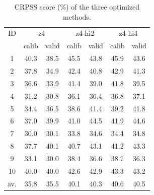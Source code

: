 \documentclass[5p]{elsarticle}
\begin{document}
\begin{table}[htbp]
	\caption{CRPSS score (\%) of the three optimized methods.}
	\footnotesize
	\begin{center}
		\begin{tabular}{ccccccc}
			\hline 
			ID & \multicolumn{2}{c}{z4} & \multicolumn{2}{c}{z4-hi2} & \multicolumn{2}{c}{z4-hi4} \\ 
			& calib & valid & calib & valid & calib & valid \\ 
			\hline 
			1 & 40.3 & 38.5 & 45.5 & 43.8 & 45.9 & 43.6 \\
			2 & 37.8 & 34.9 & 42.4 & 40.8 & 42.9 & 41.3 \\
			3 & 36.6 & 33.9 & 41.4 & 39.0 & 41.8 & 39.5 \\
			4 & 31.2 & 30.8 & 36.1 & 36.4 & 36.8 & 37.1 \\
			5 & 34.4 & 36.5 & 38.6 & 41.4 & 39.2 & 41.8 \\
			6 & 37.0 & 39.9 & 41.0 & 44.5 & 41.9 & 44.6 \\
			7 & 30.0 & 30.1 & 33.8 & 34.6 & 34.4 & 34.8 \\
			8 & 37.7 & 40.1 & 40.7 & 43.1 & 41.2 & 43.3 \\
			9 & 33.1 & 30.0 & 38.4 & 36.6 & 38.7 & 36.3 \\
			10 & 40.0 & 40.0 & 42.6 & 42.9 & 43.3 & 43.2 \\
			\hline
			av. & 35.8 & 35.5 & 40.1 & 40.3 & 40.6 & 40.5 \\ 
			\hline 
		\end{tabular} 
	\end{center}
	\label{table:scores}
\end{table}
\end{document}
